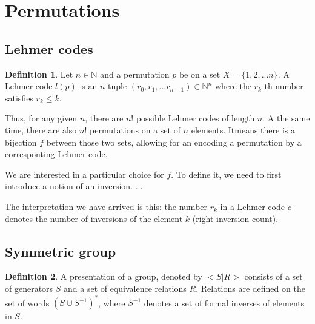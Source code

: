 \documentclass[a4paper]{article}
\newcommand{\N}{\mathbb{N}}
\theoremstyle{definition}
\newtheorem{definition}{Definition}[section]
\theoremstyle{remark}
\theoremstyle{example}
\begin{document}
\section{Permutations}
\subsection{Lehmer codes}

\begin{definition}
Let $n \in \N$ and a permutation $p$ be on a set $X = \{1, 2, ... n\}$. A Lehmer code $l(p)$ is an $n$-tuple $(r_0, r_1, ... r_{n-1})\in \N^n$ where the $r_k$-th number satisfies $r_k \leq k$. 
\end{definition}

Thus, for any given $n$, there are $n!$ possible Lehmer codes of length $n$. A the same time, there are also $n!$ permutations on a set of $n$ elements. Itmeans there is a bijection $f$ between those two sets, allowing for an encoding a permutation by a corresponting Lehmer code.

We are interested in a particular choice for $f$. To define it, we need to first introduce a notion of an inversion. 
...

The interpretation we have arrived is this: the number $r_k$ in a Lehmer code $c$ denotes the number of inversions of the element $k$ (right inversion count).

\subsection{Symmetric group}

\begin{definition}
A presentation of a group, denoted by $<S | R>$ consists of a set of generators $S$ and a set of equivalence relations $R$.
Relations are defined on the set of words $(S \cup S^{-1})^*$, where $S^{-1}$ denotes a set of formal inverses of elements in $S$.
\end{definition}
\end{document}
